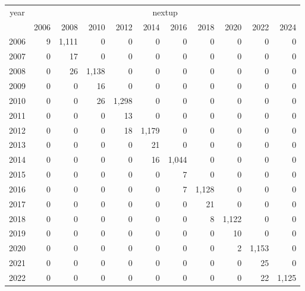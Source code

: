 \footnotesize\begin{tabular}[t]{lrrrrrrrrrr}
\toprule
\multicolumn{1}{c}{year} & \multicolumn{10}{c}{nextup} \\
\cmidrule(l{3pt}r{3pt}){1-1} \cmidrule(l{3pt}r{3pt}){2-11}
  & 2006 & 2008 & 2010 & 2012 & 2014 & 2016 & 2018 & 2020 & 2022 & 2024\\
\midrule
2006 & 9 & 1,111 & 0 & 0 & 0 & 0 & 0 & 0 & 0 & 0\\
2007 & 0 & 17 & 0 & 0 & 0 & 0 & 0 & 0 & 0 & 0\\
2008 & 0 & 26 & 1,138 & 0 & 0 & 0 & 0 & 0 & 0 & 0\\
2009 & 0 & 0 & 16 & 0 & 0 & 0 & 0 & 0 & 0 & 0\\
2010 & 0 & 0 & 26 & 1,298 & 0 & 0 & 0 & 0 & 0 & 0\\
2011 & 0 & 0 & 0 & 13 & 0 & 0 & 0 & 0 & 0 & 0\\
2012 & 0 & 0 & 0 & 18 & 1,179 & 0 & 0 & 0 & 0 & 0\\
2013 & 0 & 0 & 0 & 0 & 21 & 0 & 0 & 0 & 0 & 0\\
2014 & 0 & 0 & 0 & 0 & 16 & 1,044 & 0 & 0 & 0 & 0\\
2015 & 0 & 0 & 0 & 0 & 0 & 7 & 0 & 0 & 0 & 0\\
2016 & 0 & 0 & 0 & 0 & 0 & 7 & 1,128 & 0 & 0 & 0\\
2017 & 0 & 0 & 0 & 0 & 0 & 0 & 21 & 0 & 0 & 0\\
2018 & 0 & 0 & 0 & 0 & 0 & 0 & 8 & 1,122 & 0 & 0\\
2019 & 0 & 0 & 0 & 0 & 0 & 0 & 0 & 10 & 0 & 0\\
2020 & 0 & 0 & 0 & 0 & 0 & 0 & 0 & 2 & 1,153 & 0\\
2021 & 0 & 0 & 0 & 0 & 0 & 0 & 0 & 0 & 25 & 0\\
2022 & 0 & 0 & 0 & 0 & 0 & 0 & 0 & 0 & 22 & 1,125\\
\bottomrule
\end{tabular}
